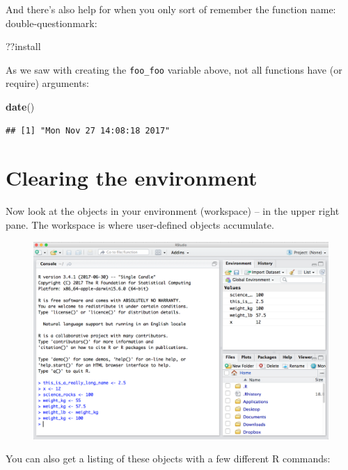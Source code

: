 \documentclass[]{book}
\newenvironment{Shaded}{\begin{snugshade}}{\end{snugshade}}
\newcommand{\KeywordTok}[1]{\textcolor[rgb]{0.13,0.29,0.53}{\textbf{#1}}}
\newcommand{\NormalTok}[1]{#1}
\theoremstyle{definition}
\theoremstyle{definition}
\theoremstyle{definition}
\theoremstyle{remark}
\begin{document}
And there's also help for when you only sort of remember the function
name: double-questionmark:

\begin{Shaded}
\begin{Highlighting}[]
\NormalTok{??install }
\end{Highlighting}
\end{Shaded}

As we saw with creating the \texttt{foo\_foo} variable above, not all
functions have (or require) arguments:

\begin{Shaded}
\begin{Highlighting}[]
\KeywordTok{date}\NormalTok{()}
\end{Highlighting}
\end{Shaded}

\begin{verbatim}
## [1] "Mon Nov 27 14:08:18 2017"
\end{verbatim}

\section{Clearing the environment}\label{clearing-the-environment}

Now look at the objects in your environment (workspace) -- in the upper
right pane. The workspace is where user-defined objects accumulate.

\begin{figure}
\centering
\includegraphics{img/RStudio_IDE_env.png}
\caption{}
\end{figure}

You can also get a listing of these objects with a few different R
commands:
\end{document}
